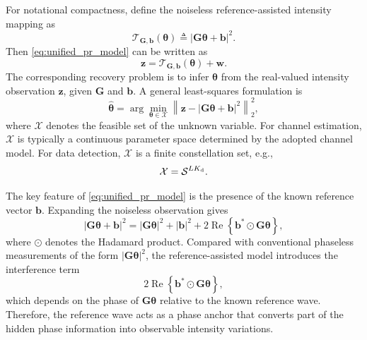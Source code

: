 \documentclass[journal]{IEEEtran}
\begin{document}
For notational compactness, define the noiseless reference-assisted intensity mapping as
\begin{equation}
\mathcal{T}_{\mathbf{G},\mathbf{b}}(\boldsymbol{\theta})
\triangleq
\left|
\mathbf{G}\boldsymbol{\theta}
+
\mathbf{b}
\right|^2.
\label{eq:intensity_mapping}
\end{equation}
Then \eqref{eq:unified_pr_model} can be written as
\begin{equation}
\mathbf{z}
=
\mathcal{T}_{\mathbf{G},\mathbf{b}}(\boldsymbol{\theta})
+
\mathbf{w}.
\label{eq:compact_mapping_model}
\end{equation}
The corresponding recovery problem is to infer $\boldsymbol{\theta}$ from the real-valued intensity observation $\mathbf{z}$, given $\mathbf{G}$ and $\mathbf{b}$. 
A general least-squares formulation is
\begin{equation}
\hat{\boldsymbol{\theta}}
=
\arg\min_{\boldsymbol{\theta}\in\mathcal{X}}
\left\|
\mathbf{z}
-
\left|
\mathbf{G}\boldsymbol{\theta}
+
\mathbf{b}
\right|^2
\right\|_2^2,
\label{eq:general_recovery_problem}
\end{equation}
where $\mathcal{X}$ denotes the feasible set of the unknown variable. 
For channel estimation, $\mathcal{X}$ is typically a continuous parameter space determined by the adopted channel model. 
For data detection, $\mathcal{X}$ is a finite constellation set, e.g.,
\begin{equation}
\mathcal{X}
=
\mathcal{S}^{LK_{\rm d}}.
\end{equation}

The key feature of \eqref{eq:unified_pr_model} is the presence of the known reference vector $\mathbf{b}$. 
Expanding the noiseless observation gives
\begin{equation}
\left|
\mathbf{G}\boldsymbol{\theta}
+
\mathbf{b}
\right|^2
=
\left|
\mathbf{G}\boldsymbol{\theta}
\right|^2
+
|\mathbf{b}|^2
+
2\operatorname{Re}
\left\{
\mathbf{b}^*
\odot
\mathbf{G}\boldsymbol{\theta}
\right\},
\label{eq:reference_expansion}
\end{equation}
where $\odot$ denotes the Hadamard product. 
Compared with conventional phaseless measurements of the form $|\mathbf{G}\boldsymbol{\theta}|^2$, the reference-assisted model introduces the interference term
\begin{equation}
2\operatorname{Re}
\left\{
\mathbf{b}^*
\odot
\mathbf{G}\boldsymbol{\theta}
\right\},
\end{equation}
which depends on the phase of $\mathbf{G}\boldsymbol{\theta}$ relative to the known reference wave. 
Therefore, the reference wave acts as a phase anchor that converts part of the hidden phase information into observable intensity variations.
\end{document}
